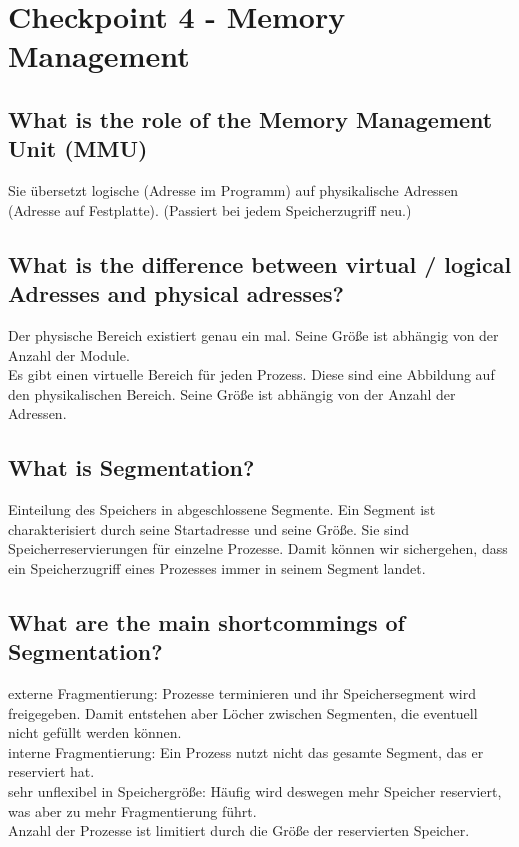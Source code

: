 \section{Checkpoint 4 - Memory Management}

\addtocounter{subsection}{1}

\subsection{\important What is the role of the Memory Management Unit (MMU)}
Sie übersetzt logische (Adresse im Programm) auf physikalische Adressen (Adresse auf Festplatte).
(Passiert bei jedem Speicherzugriff neu.)

\subsection{\important What is the difference between virtual / logical Adresses and physical adresses?}
Der physische Bereich existiert genau ein mal.
Seine Größe ist abhängig von der Anzahl der Module.\\
Es gibt einen virtuelle Bereich für jeden Prozess.
Diese sind eine Abbildung auf den physikalischen Bereich.
Seine Größe ist abhängig von der Anzahl der Adressen.

\subsection{What is Segmentation?}
Einteilung des Speichers in abgeschlossene Segmente.
Ein Segment ist charakterisiert durch seine Startadresse und seine Größe.
Sie sind Speicherreservierungen für einzelne Prozesse.
Damit können wir sichergehen, dass ein Speicherzugriff eines Prozesses immer in seinem Segment landet.

\subsection{What are the main shortcommings of Segmentation?}
externe Fragmentierung: Prozesse terminieren und ihr Speichersegment wird freigegeben. Damit entstehen aber Löcher zwischen Segmenten, die eventuell nicht gefüllt werden können.\\
interne Fragmentierung: Ein Prozess nutzt nicht das gesamte Segment, das er reserviert hat.\\
sehr unflexibel in Speichergröße: Häufig wird deswegen mehr Speicher reserviert, was aber zu mehr Fragmentierung führt.\\
Anzahl der Prozesse ist limitiert durch die Größe der reservierten Speicher.

